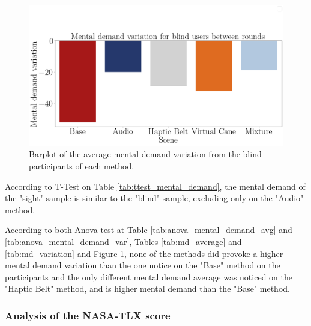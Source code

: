 



\begin{figure}[!htb]
    \centering
    \includegraphics[width = 0.8\linewidth]{Resultados/Nasa/Figuras/png/barplot_md_var_scene_blind.png}
    \caption{Barplot of the average mental demand variation from the blind participants of each method.}
    \label{fig:barplot_md_var_scene_blind}
\end{figure}

According to T-Test on Table \ref{tab:ttest_mental_demand}, the mental demand of the "sight" sample is similar to the "blind" sample, excluding only on the "Audio" method.

According to both Anova test at Table \ref{tab:anova_mental_demand_avg} and \ref{tab:anova_mental_demand_var}, Tables \ref{tab:md_average} and \ref{tab:md_variation} and Figure \ref{fig:barplot_md_var_scene_blind}, none of the methods did provoke a higher mental demand variation than the one notice on the "Base" method on the participants and the only different mental demand average was noticed on the "Haptic Belt" method, and is higher mental demand than the "Base" method.

\FloatBarrier



\subsubsection{Analysis of the NASA-TLX score}

